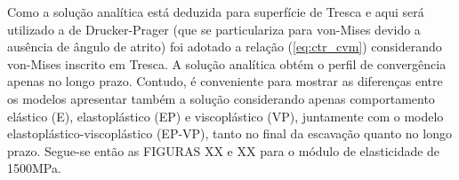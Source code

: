 Como a solução analítica está deduzida para superfície de Tresca e aqui será utilizado a de Drucker-Prager (que se particulariza para von-Mises devido a ausência de ângulo de atrito) foi adotado a relação (\ref{eq:ctr_cvm}) considerando von-Mises inscrito em Tresca. A solução analítica obtém o perfil de convergência apenas no longo prazo. Contudo, é conveniente para mostrar as diferenças entre os modelos apresentar também a solução considerando apenas comportamento elástico (E), elastoplástico (EP) e viscoplástico (VP), juntamente com o modelo elastoplástico-viscoplástico (EP-VP), tanto no final da escavação quanto no longo prazo. Segue-se então as FIGURAS XX e XX para o módulo de elasticidade de 1500MPa.

